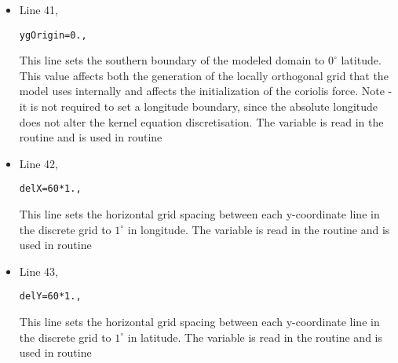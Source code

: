 \begin{itemize}

\item Line 41,
\begin{verbatim}
ygOrigin=0.,
\end{verbatim}
  This line sets the southern boundary of the modeled domain to
  $0^{\circ}$ latitude. This value affects both the generation of the
  locally orthogonal grid that the model uses internally and affects
  the initialization of the coriolis force.  Note - it is not required
  to set a longitude boundary, since the absolute longitude does not
  alter the kernel equation discretisation.  The variable
   is read in the
  routine  and is used in routine


\item Line 42,
\begin{verbatim}
delX=60*1.,
\end{verbatim}
  This line sets the horizontal grid spacing between each y-coordinate
  line in the discrete grid to $1^{\circ}$ in longitude.  The variable
   is read in the routine
   and is used in routine
 

\item Line 43,
\begin{verbatim}
delY=60*1.,
\end{verbatim}
  This line sets the horizontal grid spacing between each y-coordinate
  line in the discrete grid to $1^{\circ}$ in latitude.  The variable
   is read in the routine
   and is used in routine


\end{itemize}
